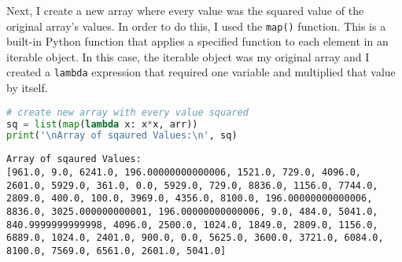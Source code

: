 \documentclass[journal]{IEEEtran}
\begin{document}
Next, I create a new array where every value was the squared value of the original array’s values. In order to do this, I used the \lstinline{map()} function. This is a built-in Python function that applies a specified function to each element in an iterable object. In this case, the iterable object was my original array and I created a \lstinline{lambda} expression that required one variable and multiplied that value by itself. 
\begin{lstlisting}[language=Python, caption=Squaring each Element in Array]
# create new array with every value squared 
sq = list(map(lambda x: x*x, arr))
print('\nArray of sqaured Values:\n', sq)
\end{lstlisting}
\begin{lstlisting}[caption={Squared Array}]
Array of sqaured Values:
[961.0, 9.0, 6241.0, 196.00000000000006, 1521.0, 729.0, 4096.0, 2601.0, 5929.0, 361.0, 0.0, 5929.0, 729.0, 8836.0, 1156.0, 7744.0, 2809.0, 400.0, 100.0, 3969.0, 4356.0, 8100.0, 196.00000000000006, 8836.0, 3025.000000000001, 196.00000000000006, 9.0, 484.0, 5041.0, 840.9999999999998, 4096.0, 2500.0, 1024.0, 1849.0, 2809.0, 1156.0, 6889.0, 1024.0, 2401.0, 900.0, 0.0, 5625.0, 3600.0, 3721.0, 6084.0, 8100.0, 7569.0, 6561.0, 2601.0, 5041.0]
\end{lstlisting}
\end{document}
